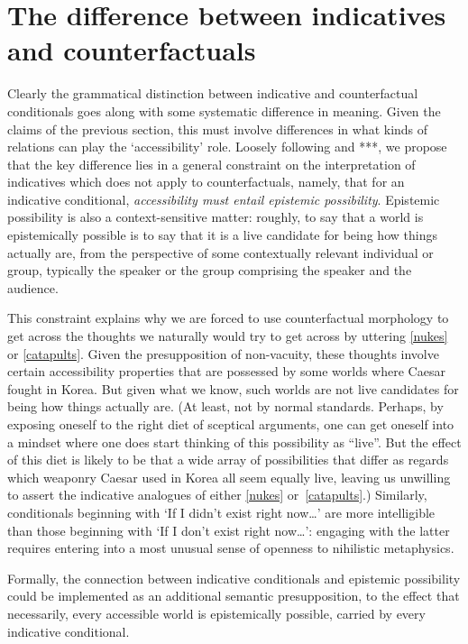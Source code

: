 \documentclass[If.tex]{subfiles}
\begin{document}
\section{The difference between indicatives and counterfactuals} \label{sect:indcf}
Clearly the grammatical distinction between indicative and counterfactual conditionals goes along with some systematic difference in meaning.  Given the claims of the previous section, this must involve differences in what kinds of relations can play the ‘accessibility’ role.  Loosely following \citet{FintelPSC} and ***, we propose that the key difference lies in a general constraint on the interpretation of indicatives which does not apply to counterfactuals, namely, that for an indicative conditional, \emph{accessibility must entail epistemic possibility}.  Epistemic possibility is also a context-sensitive matter: roughly, to say that a world is epistemically possible is to say that it is a live candidate for being how things actually are, from the perspective of some contextually relevant individual or group, typically the speaker or the group comprising the speaker and the audience.  

This constraint explains why we are forced to use counterfactual morphology to get across the thoughts we naturally would try to get across by uttering \ref{nukes} or \ref{catapults}. Given the presupposition of non-vacuity, these thoughts involve certain accessibility properties that are possessed by some worlds where Caesar fought in Korea.  But given what we know, such worlds are not live candidates for being how things actually are.  (At least, not by normal standards.  Perhaps, by exposing oneself to the right diet of sceptical arguments, one can get oneself into a mindset where one does start thinking of this possibility as “live”.   But the effect of this diet is likely to be that a wide array of possibilities that differ as regards which weaponry Caesar used in Korea all seem equally live, leaving us unwilling to assert the indicative analogues of either \ref{nukes} or~\ref{catapults}.)  Similarly, conditionals beginning with ‘If I didn't exist right now\ldots{}’ are more intelligible than those beginning with ‘If I don't exist right now\ldots{}’: engaging with the latter requires entering into a most unusual sense of openness to nihilistic metaphysics.

Formally, the connection between indicative conditionals and epistemic possibility could be implemented as an additional semantic presupposition, to the effect that necessarily, every accessible world is epistemically possible, carried by every indicative conditional.  
\end{document}
